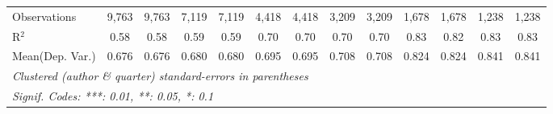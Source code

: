 \begin{tabular}{lcccccccccccc}
   Observations                             & 9,763        & 9,763       & 7,119        & 7,119       & 4,418       & 4,418       & 3,209       & 3,209    & 1,678        & 1,678   & 1,238        & 1,238\\  
   R$^2$                                    & 0.58         & 0.58        & 0.59         & 0.59        & 0.70        & 0.70        & 0.70        & 0.70     & 0.83         & 0.82    & 0.83         & 0.83\\  
Mean(Dep. Var.) & 0.676 & 0.676 & 0.680 & 0.680 & 0.695 & 0.695 & 0.708 & 0.708 & 0.824 & 0.824 & 0.841 & 0.841 \\
   \midrule \midrule
   \multicolumn{13}{l}{\emph{Clustered (author \& quarter) standard-errors in parentheses}}\\
   \multicolumn{13}{l}{\emph{Signif. Codes: ***: 0.01, **: 0.05, *: 0.1}}\\
\end{tabular}
\par\endgroup
